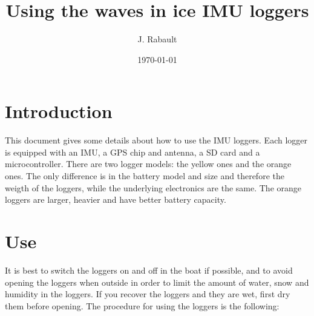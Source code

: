 \documentclass[pdftex,a4paper,12pt,twocolumn,fleqn,captions=tableheading]{scrartcl}
\begin{document}
\title{Using the waves in ice IMU loggers}
\author{J. Rabault
  }
\date{\today}

\maketitle

\section{Introduction}

This document gives some details about how to use the IMU loggers. Each logger is equipped with an IMU, a GPS chip and antenna, a SD card and a microcontroller. There are two logger models: the yellow ones and the orange ones. The only difference is in the battery model and size and therefore the weigth of the loggers, while the underlying electronics are the same. The orange loggers are larger, heavier and have better battery capacity.

\section{Use}

It is best to switch the loggers on and off in the boat if possible, and to avoid opening the loggers when outside in order to limit the amount of water, snow and humidity in the loggers. If you recover the loggers and they are wet, first dry them before opening. The procedure for using the loggers is the following:
\end{document}
